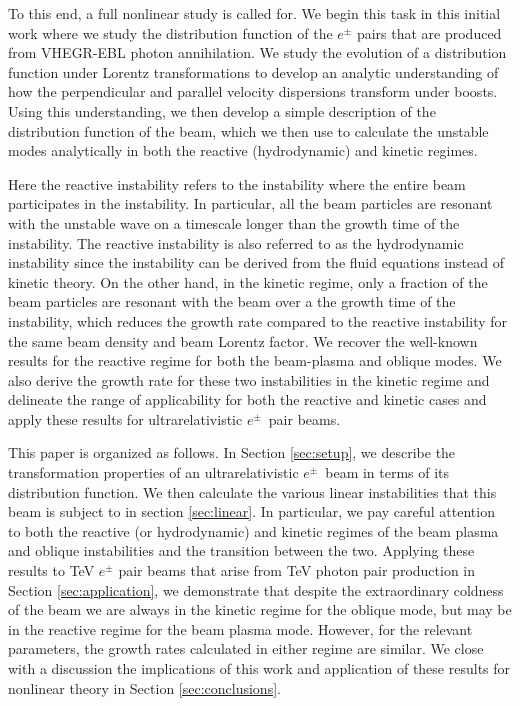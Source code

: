 \documentclass[usenatbib,iop,apj,numberedappendix]{aeb_emulateapj_2015}
\newcommand{\epm}{\ensuremath{e^{\pm}}}
\begin{document}
To this end, a full nonlinear study is called for.  We begin this task in this initial work where we study the distribution function of the $\epm$ pairs that are produced from VHEGR-EBL photon annihilation.  We study the evolution of a distribution function under Lorentz transformations to develop an analytic understanding of how the perpendicular and parallel velocity dispersions transform under boosts.  Using this understanding, we then develop a simple description of the distribution function of the beam, which we then use to calculate the unstable modes analytically in both the reactive (hydrodynamic) and kinetic regimes.

Here the reactive instability refers to the instability where the entire beam participates in the instability.  In particular, all the beam particles are resonant with the unstable wave on a timescale longer than the growth time of the instability.  The reactive instability is also referred to as the hydrodynamic instability since the instability can be derived from the fluid equations instead of kinetic theory.  On the other hand, in the kinetic regime, only a fraction of the beam particles are resonant with the beam over a the growth time of the instability, which reduces the growth rate compared to the reactive instability for the same beam density and beam Lorentz factor.  We recover the well-known results for the reactive regime for both the beam-plasma and oblique modes.  We also derive the growth rate for these two instabilities in the kinetic regime and delineate the range of applicability for both the reactive and kinetic cases and apply these results for ultrarelativistic \epm\ pair beams. 

This paper is organized as follows.  In Section \ref{sec:setup}, we describe the transformation properties of an ultrarelativistic \epm\ beam in terms of its distribution function.  We then calculate the various linear instabilities that this beam is subject to in section \ref{sec:linear}.  In particular, we pay careful attention to both the reactive (or hydrodynamic) and kinetic regimes of the beam plasma and oblique instabilities and the transition between the two.  Applying these results to TeV $\epm$ pair beams that arise from TeV photon pair production in Section \ref{sec:application},
we demonstrate that despite the extraordinary coldness of the beam we are always in the kinetic regime for the oblique mode, but may be in the reactive regime for the beam plasma mode.  However, for the relevant parameters, the growth rates calculated in either regime are similar.  We close with a discussion the implications of this work and application of these results for nonlinear theory in Section \ref{sec:conclusions}.
\end{document}
